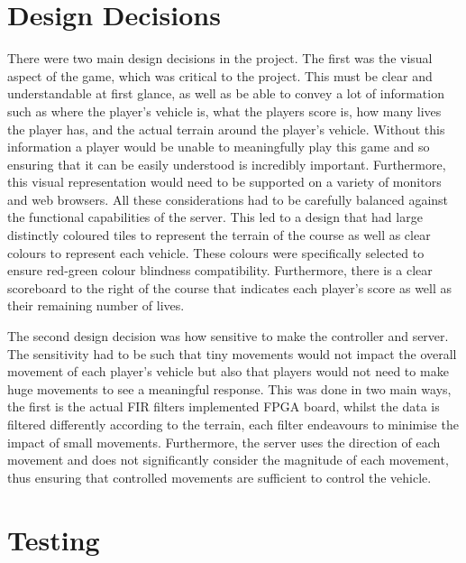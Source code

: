 \documentclass[12pt,a4paper]{article}
\begin{document}
\section{\normalsize Design Decisions}

There were two main design decisions in the project. The first was the visual aspect 
of the game, which was critical to the project. This must be clear and understandable 
at first glance, as well as be able to convey a lot of information such as where the 
player’s vehicle is, what the players score is, how many lives the player has, and 
the actual terrain around the player’s vehicle. Without this information a player 
would be unable to meaningfully play this game and so ensuring that it can be easily 
understood is incredibly important. Furthermore, this visual representation would 
need to be supported on a variety of monitors and web browsers. All these 
considerations had to be carefully balanced against the functional capabilities 
of the server. This led to a design that had large distinctly coloured tiles to 
represent the terrain of the course as well as clear colours to represent each 
vehicle. These colours were specifically selected to ensure red-green colour 
blindness compatibility.  Furthermore, there is a clear scoreboard to the right of 
the course that indicates each player's score as well as their remaining number of lives.
\par
The second design decision was how sensitive to make the controller and server. The 
sensitivity had to be such that tiny movements would not impact the overall movement 
of each player’s vehicle but also that players would not need to make huge movements 
to see a meaningful response. This was done in two main ways, the first is the actual 
FIR filters implemented FPGA board, whilst the data is filtered differently according 
to the terrain, each filter endeavours to minimise the impact of small movements. 
Furthermore, the server uses the direction of each movement and does not significantly 
consider the magnitude of each movement, thus ensuring that controlled movements are 
sufficient to control the vehicle. 

\section{\normalsize Testing}
\end{document}
